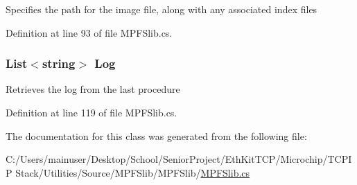 Specifies the path for the image file, along with any associated index files 



Definition at line 93 of file M\+P\+F\+Slib.\+cs.

\hypertarget{class_microchip_1_1_m_p_f_s_builder_a06712a1c8dec792865a961869c7acf59}{}
\subsubsection[{Log}]{\setlength{\rightskip}{0pt plus 5cm}List$<$string$>$ Log\hspace{0.3cm}{\ttfamily [get]}}\label{class_microchip_1_1_m_p_f_s_builder_a06712a1c8dec792865a961869c7acf59}


Retrieves the log from the last procedure 



Definition at line 119 of file M\+P\+F\+Slib.\+cs.



The documentation for this class was generated from the following file\+:\begin{DoxyCompactItemize}
\item 
C\+:/\+Users/mainuser/\+Desktop/\+School/\+Senior\+Project/\+Eth\+Kit\+T\+C\+P/\+Microchip/\+T\+C\+P\+I\+P Stack/\+Utilities/\+Source/\+M\+P\+F\+Slib/\+M\+P\+F\+Slib/\hyperlink{_m_p_f_slib_8cs}{M\+P\+F\+Slib.\+cs}\end{DoxyCompactItemize}
